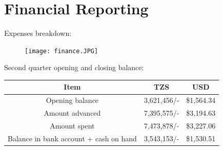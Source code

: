 \documentclass[a4paper,12pt,twoside]{article}
\begin{document}
\section{Financial Reporting}
Expenses breakdown:

\begin{figure}[h]
    \centering
    \texttt{[image: finance.JPG]}
\end{figure}

Second quarter opening and closing balance:
\begin{center}
	\begin{tabular}{|c|c|c|}
		\hline
		Item & TZS & USD \\
		\hline
		\rowcolor{Gray}
		Opening balance & 3,621,456/- & \$1,564.34 \\
	
		Amount advanced & 7,395,575/- & \$3,194.63 \\
		
		\rowcolor{Gray}
		Amount spent & 7,473,878/- & \$3,227.06 \\
		
		Balance in bank account + cash on hand & 3,543,153/- & \$1,530.51 \\
		\hline
	\end{tabular}
\end{center}
\end{document}
